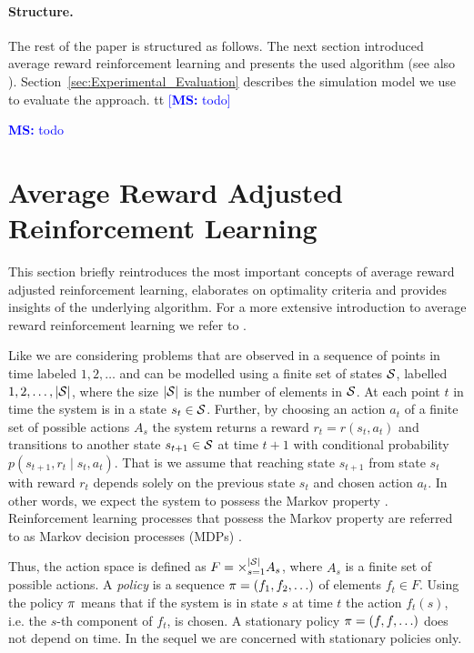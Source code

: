 \documentclass[envcountsame]{llncs}
\newcommand\MS[2][r]{\ifx t#1 \textcolor{blue}{[\textbf{MS:} #2]}
  \else \begin{center}\textcolor{blue}{\textbf{MS:} #2} \end{center} \fi}
\begin{document}
\paragraph{Structure.} The rest of the paper is structured as follows. The next section introduced
average reward reinforcement learning and presents the used algorithm (see also
\citealt{schneckenreither2020average}). Section~\ref{sec:Experimental_Evaluation} describes the
simulation model we use to evaluate the approach. \MS[t]{todo}


\section{Average Reward Adjusted Reinforcement Learning}

This section briefly reintroduces the most important concepts of average reward adjusted
reinforcement learning, elaborates on optimality criteria and provides insights of the underlying
algorithm. For a more extensive introduction to average reward reinforcement learning we refer to
\citet{schneckenreither2020average}.

Like \cite{MillerVeinott1969} we are considering problems that are observed in a sequence of points
in time labeled \(1,2,\ldots\) and can be modelled using a finite set of states \(\mathcal{S}\),
labelled \(1,2,\ldots,\lvert{\mathcal{S}}\rvert\), where the size \(\lvert{\mathcal{S}}\rvert\) is the number of elements
in \(\mathcal{S}\). At each point $t$ in time the system is in a state \(s_{t} \in \mathcal{S}\). Further,
by choosing an action $a_{t}$ of a finite set of possible actions \(A_{s}\) the system returns a
reward $r_{t} = r(s_{t}, a_{t})$ and transitions to another state \(s_{t+1} \in \mathcal{S}\) at time
\(t+1\) with conditional probability \(p(s_{t+1}, r_{t} \mid s_{t}, a_{t})\). That is we assume that
reaching state \(s_{t+1}\) from state \(s_{t}\) with reward \(r_{t}\) depends solely on the previous
state \(s_{t}\) and chosen action \(a_{t}\). In other words, we expect the system to possess the
Markov property \citep[p.63]{sutton1998introduction}. Reinforcement learning processes that possess
the Markov property are referred to as Markov decision processes (MDPs)
\citep[p.66]{sutton1998introduction}.

Thus, the action space is defined as \(F = \times_{s=1}^{\lvert{\mathcal{S}}\rvert} A_{s}\), where \(A_{s}\) is
a finite set of possible actions. A \emph{policy} is a sequence \(\pi = (f_{1},f_{2},\ldots)\) of
elements \(f_{t} \in F\). Using the policy \(\pi\) means that if the system is in state \(s\) at
time \(t\) the action \(f_{t}(s)\), i.e.%
the \(s\)-th component of \(f_{t}\), is chosen. A stationary policy \(\pi = (f,f,\ldots)\) does not
depend on time. In the sequel we are concerned with stationary policies only.
\end{document}
